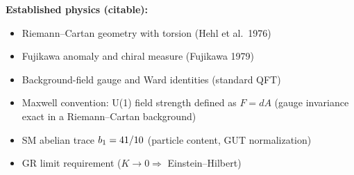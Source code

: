 \vspace{0.5em}
\begin{tcolorbox}[colback=yellow!5, colframe=yellow!60!black, 
    title={\textbf{Assumption Ledger: Established vs.\ New}}, fonttitle=\bfseries]

\textbf{Established physics (citable):}
\begin{itemize}[leftmargin=1.5em, topsep=2pt, itemsep=1pt]
    \item Riemann--Cartan geometry with torsion (Hehl et al.~1976)
    \item Fujikawa anomaly and chiral measure (Fujikawa 1979)
    \item Background-field gauge and Ward identities (standard QFT)
    \item Maxwell convention: U(1) field strength defined as $F=dA$ (gauge invariance exact in a Riemann--Cartan background)
    \item SM abelian trace $b_1 = 41/10$ (particle content, GUT normalization)
    \item GR limit requirement ($K \to 0 \Rightarrow$ Einstein--Hilbert)
\end{itemize}


\end{tcolorbox}
